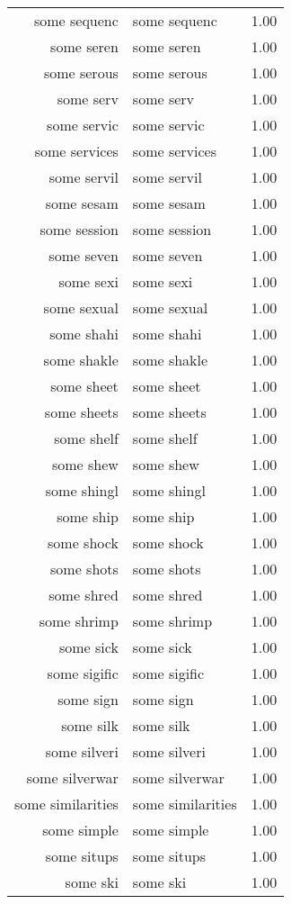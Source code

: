 \begin{table}[ht]
\begin{tabular}{rlr}
  some sequenc & some sequenc & 1.00 \\ 
  some seren & some seren & 1.00 \\ 
  some serous & some serous & 1.00 \\ 
  some serv & some serv & 1.00 \\ 
  some servic & some servic & 1.00 \\ 
  some services & some services & 1.00 \\ 
  some servil & some servil & 1.00 \\ 
  some sesam & some sesam & 1.00 \\ 
  some session & some session & 1.00 \\ 
  some seven & some seven & 1.00 \\ 
  some sexi & some sexi & 1.00 \\ 
  some sexual & some sexual & 1.00 \\ 
  some shahi & some shahi & 1.00 \\ 
  some shakle & some shakle & 1.00 \\ 
  some sheet & some sheet & 1.00 \\ 
  some sheets & some sheets & 1.00 \\ 
  some shelf & some shelf & 1.00 \\ 
  some shew & some shew & 1.00 \\ 
  some shingl & some shingl & 1.00 \\ 
  some ship & some ship & 1.00 \\ 
  some shock & some shock & 1.00 \\ 
  some shots & some shots & 1.00 \\ 
  some shred & some shred & 1.00 \\ 
  some shrimp & some shrimp & 1.00 \\ 
  some sick & some sick & 1.00 \\ 
  some sigific & some sigific & 1.00 \\ 
  some sign & some sign & 1.00 \\ 
  some silk & some silk & 1.00 \\ 
  some silveri & some silveri & 1.00 \\ 
  some silverwar & some silverwar & 1.00 \\ 
  some similarities & some similarities & 1.00 \\ 
  some simple & some simple & 1.00 \\ 
  some situps & some situps & 1.00 \\ 
  some ski & some ski & 1.00 \\ 

\end{tabular}
\end{table}
